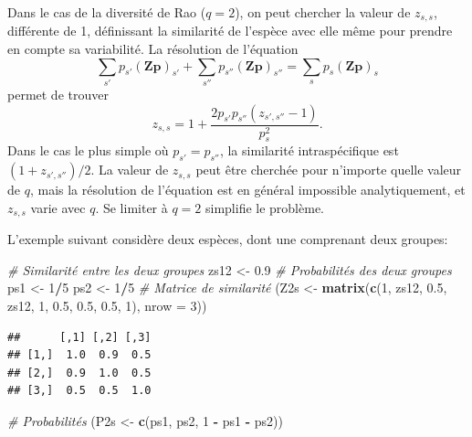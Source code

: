 \documentclass[
  11pt,
  french,
  a4paper,
  extrafontsizes,onecolumn,openright
  ]{memoir}
\newenvironment{Shaded}{\begin{snugshade}}{\end{snugshade}}
\newcommand{\CommentTok}[1]{\textcolor[rgb]{0.56,0.35,0.01}{\textit{#1}}}
\newcommand{\DataTypeTok}[1]{\textcolor[rgb]{0.13,0.29,0.53}{#1}}
\newcommand{\DecValTok}[1]{\textcolor[rgb]{0.00,0.00,0.81}{#1}}
\newcommand{\FloatTok}[1]{\textcolor[rgb]{0.00,0.00,0.81}{#1}}
\newcommand{\KeywordTok}[1]{\textcolor[rgb]{0.13,0.29,0.53}{\textbf{#1}}}
\newcommand{\NormalTok}[1]{#1}
\newcommand{\OperatorTok}[1]{\textcolor[rgb]{0.81,0.36,0.00}{\textbf{#1}}}
\newcommand{\StringTok}[1]{\textcolor[rgb]{0.31,0.60,0.02}{#1}}
\begin{document}
Dans le cas de la diversité de Rao (\(q=2\)), on peut chercher la valeur de \(z_{s,s}\), différente de 1, définissant la similarité de l'espèce avec elle même pour prendre en compte sa variabilité.
La résolution de l'équation
\[\sum_{s'}{p_{s'}{\left(\mathbf{Zp}\right)}_{s'}}+\sum_{s''}{p_{s''}{\left(\mathbf{Zp}\right)}_{s''}} = \sum_{s}{p_{s}{\left(\mathbf{Zp}\right)}_{s}}\]
permet de trouver
\[z_{s,s}=1+ \frac{2 p_{s'} p_{s''}(z_{s',s''}-1)}{p_s^2}.\]
Dans le cas le plus simple où \(p_{s'}=p_{s''}\), la similarité intraspécifique est \({(1+z_{s',s''})}/{2}\).
La valeur de \(z_{s,s}\) peut être cherchée pour n'importe quelle valeur de \(q\), mais la résolution de l'équation est en général impossible analytiquement, et \(z_{s,s}\) varie avec \(q\).
Se limiter à \(q=2\) simplifie le problème.

L'exemple suivant considère deux espèces, dont une comprenant deux groupes:

\scriptsize

\begin{Shaded}
\begin{Highlighting}[]
\CommentTok{# Similarité entre les deux groupes}
\NormalTok{zs12 <-}\StringTok{ }\FloatTok{0.9}
\CommentTok{# Probabilités des deux groupes}
\NormalTok{ps1 <-}\StringTok{ }\DecValTok{1}\OperatorTok{/}\DecValTok{5}
\NormalTok{ps2 <-}\StringTok{ }\DecValTok{1}\OperatorTok{/}\DecValTok{5}
\CommentTok{# Matrice de similarité}
\NormalTok{(Z2s <-}\StringTok{ }\KeywordTok{matrix}\NormalTok{(}\KeywordTok{c}\NormalTok{(}\DecValTok{1}\NormalTok{, zs12, }\FloatTok{0.5}\NormalTok{, zs12, }\DecValTok{1}\NormalTok{, }\FloatTok{0.5}\NormalTok{, }\FloatTok{0.5}\NormalTok{, }\FloatTok{0.5}\NormalTok{, }\DecValTok{1}\NormalTok{), }\DataTypeTok{nrow =} \DecValTok{3}\NormalTok{))}
\end{Highlighting}
\end{Shaded}

\begin{verbatim}
##      [,1] [,2] [,3]
## [1,]  1.0  0.9  0.5
## [2,]  0.9  1.0  0.5
## [3,]  0.5  0.5  1.0
\end{verbatim}

\begin{Shaded}
\begin{Highlighting}[]
\CommentTok{# Probabilités}
\NormalTok{(P2s <-}\StringTok{ }\KeywordTok{c}\NormalTok{(ps1, ps2, }\DecValTok{1} \OperatorTok{-}\StringTok{ }\NormalTok{ps1 }\OperatorTok{-}\StringTok{ }\NormalTok{ps2))}
\end{Highlighting}
\end{Shaded}
\end{document}
